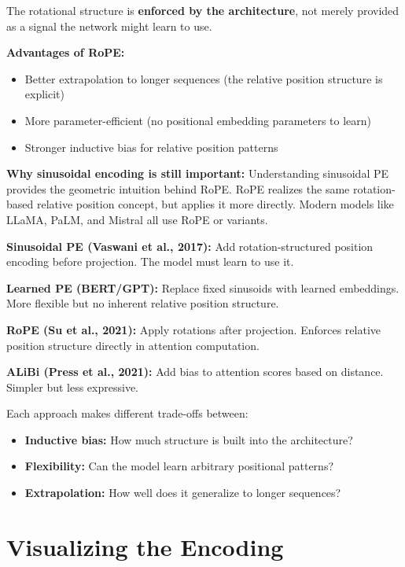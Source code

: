 \documentclass{article}
\begin{document}
The rotational structure is \textbf{enforced by the architecture}, not merely provided as a signal the network might learn to use.

\textbf{Advantages of RoPE:}
\begin{itemize}
\item Better extrapolation to longer sequences (the relative position structure is explicit)
\item More parameter-efficient (no positional embedding parameters to learn)
\item Stronger inductive bias for relative position patterns
\end{itemize}

\textbf{Why sinusoidal encoding is still important:} Understanding sinusoidal PE provides the geometric intuition behind RoPE. RoPE realizes the same rotation-based relative position concept, but applies it more directly. Modern models like LLaMA, PaLM, and Mistral all use RoPE or variants.

\begin{tcolorbox}[colback=blue!5!white, colframe=blue!50!black, title=Evolution of Positional Encoding]
\textbf{Sinusoidal PE (Vaswani et al., 2017):} Add rotation-structured position encoding before projection. The model must learn to use it.

\textbf{Learned PE (BERT/GPT):} Replace fixed sinusoids with learned embeddings. More flexible but no inherent relative position structure.

\textbf{RoPE (Su et al., 2021):} Apply rotations after projection. Enforces relative position structure directly in attention computation.

\textbf{ALiBi (Press et al., 2021):} Add bias to attention scores based on distance. Simpler but less expressive.

Each approach makes different trade-offs between:
\begin{itemize}
\item \textbf{Inductive bias:} How much structure is built into the architecture?
\item \textbf{Flexibility:} Can the model learn arbitrary positional patterns?
\item \textbf{Extrapolation:} How well does it generalize to longer sequences?
\end{itemize}
\end{tcolorbox}

\section{Visualizing the Encoding}
\end{document}
